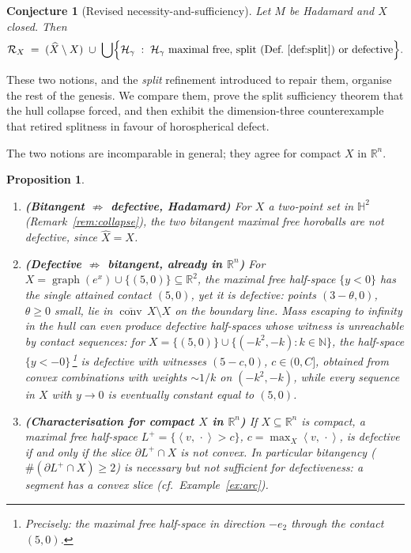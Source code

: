 \documentclass[11pt]{article}
\newtheorem{proposition}[theorem]{Proposition}
\newtheorem{conjecture}[theorem]{Conjecture}
\theoremstyle{remark}
\newcommand{\R}{\mathbb{R}}
\newcommand{\X}{X}
\newcommand{\Xhat}{\widehat{\X}}
\newcommand{\Rx}{\mathcal{R}_{\X}}
\newcommand{\Hb}[1]{\mathcal{H}_{#1}}
\newcommand{\conv}{\operatorname{conv}}
\newcommand{\cconv}[1]{\overline{\conv}\,#1}
\newcommand{\sca}[2]{\left\langle #1,\, #2\right\rangle}
\begin{document}
\begin{conjecture}[Revised necessity-and-sufficiency]
\label{conj:revised}
Let $M$ be Hadamard and $\X$ closed. Then
\[
\Rx \;=\; (\Xhat\setminus\X)\;\cup\;
\bigcup\Bigl\{\Hb{\gamma} \;:\; \Hb{\gamma}\ \text{maximal free,
split (Def.~\ref{def:split}) or defective}\Bigr\}.
\]
\end{conjecture}

These two notions, and the \emph{split} refinement
introduced to repair them, organise the rest of the genesis. We compare
them, prove the split sufficiency theorem that the hull collapse forced,
and then exhibit the dimension-three counterexample that retired
splitness in favour of horospherical defect.

The two notions are incomparable in general; they agree for compact
$\X$ in $\R^{n}$.

\begin{proposition}\label{prop:taxonomy}
\begin{enumerate}[label=(\alph*)]
\item \textbf{(Bitangent $\not\Rightarrow$ defective, Hadamard)} For
$\X$ a two-point set in $\mathbb{H}^{2}$
(Remark~\ref{rem:collapse}), the two bitangent maximal free horoballs
are not defective, since $\Xhat=\X$.
\item \textbf{(Defective $\not\Rightarrow$ bitangent, already in
$\R^{n}$)} For $\X=\operatorname{graph}(e^{x})\cup\{(5,0)\}
\subseteq\R^{2}$, the maximal free half-space $\{y<0\}$ has the single
attained contact $(5,0)$, yet it is defective: points $(3-\theta,0)$,
$\theta\ge0$ small, lie in $\cconv\X\setminus\X$ on the boundary line.
Mass escaping to infinity in the hull can even produce defective
half-spaces whose witness is unreachable by contact sequences: for
$\X=\{(5,0)\}\cup\{(-k^{2},-k):k\in\mathbb{N}\}$, the half-space
$\{y<-0\}$\,\footnote{Precisely: the maximal free half-space in
direction $-e_{2}$ through the contact $(5,0)$.} is defective with
witnesses $(5-c,0)$, $c\in(0,C]$, obtained from convex combinations
with weights $\sim1/k$ on $(-k^{2},-k)$, while every sequence in $\X$
with $y\to0$ is eventually constant equal to $(5,0)$.
\item \textbf{(Characterisation for compact $\X$ in $\R^{n}$)} If
$\X\subseteq\R^{n}$ is compact, a maximal free half-space
$L^{+}=\{\sca{v}{\cdot}>c\}$, $c=\max_{\X}\sca{v}{\cdot}$, is
defective if and only if the slice $\partial L^{+}\cap\X$ is
\emph{not convex}. In particular bitangency
($\#(\partial L^{+}\cap\X)\ge2$) is necessary but not sufficient for
defectiveness: a segment has a convex slice
(cf.\ Example~\ref{ex:arc}).
\end{enumerate}
\end{proposition}
\end{document}
